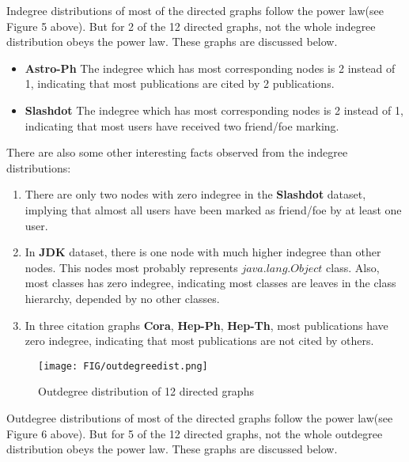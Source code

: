 \par Indegree distributions of most of the directed graphs follow the power law(see Figure 5 above). But for 2 of the 12 directed graphs, not the whole indegree distribution obeys the power law. These graphs are discussed below.

\begin{itemize}
\item \textbf{Astro-Ph} The indegree which has most corresponding nodes is 2 instead of 1, indicating that most publications are cited by 2 publications.
\item \textbf{Slashdot} The indegree which has most corresponding nodes is 2 instead of 1, indicating that most users have received two friend/foe marking.
\end{itemize}

There are also some other interesting facts observed from the indegree distributions:
\begin{enumerate}
\item There are only two nodes with zero indegree in the \textbf{Slashdot} dataset, implying that almost all users have been marked as friend/foe by at least one user.
\item In \textbf{JDK} dataset, there is one node with much higher indegree than other nodes. This nodes most probably represents $java.lang.Object$ class. Also, most classes has zero indegree, indicating most classes are leaves in the class hierarchy, depended by no other classes.
\item In three citation graphs \textbf{Cora}, \textbf{Hep-Ph}, \textbf{Hep-Th}, most publications have zero indegree, indicating that most publications are not cited by others.
\end{enumerate}

\begin{figure}[H]
\begin{center}
\texttt{[image: FIG/outdegreedist.png]}
\caption{Outdegree distribution of 12 directed graphs}
\end{center}
\end{figure}

\par Outdegree distributions of most of the directed graphs follow the power law(see Figure 6 above). But for 5 of the 12 directed graphs, not the whole outdegree distribution obeys the power law. These graphs are discussed below.

